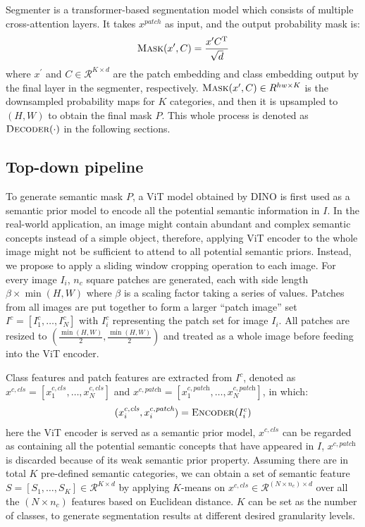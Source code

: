 \documentclass[runningheads]{llncs}
\begin{document}
Segmenter is a transformer-based segmentation model which consists of multiple cross-attention layers. It takes  $x^{patch}$  as input, and the output probability mask is: 
\begin{align}
    \Call{Mask}{x^\prime, C} = \frac{x^\prime C^\mathrm{T}}{\sqrt{d}}
    \label{eq:segmenter}
\end{align}
where $x^\prime$ and $C \in \mathcal{R}^{K \times d}$ are the patch embedding and class embedding output by the final layer in the segmenter, respectively. $\Call{Mask}{x^\prime, C} \in R^{hw \times K}$ is the downsampled probability maps for $K$ categories, and then it is upsampled to $(H, W)$ to obtain the final mask $P$. This whole process is denoted as $\Call{Decoder}{\cdot}$ in the following sections.

\subsection{Top-down pipeline}

To generate semantic mask $P$, a ViT model obtained by DINO is first used as a semantic prior model to encode all the potential semantic information in $I$. In the real-world application, an image might contain abundant and complex semantic concepts instead of a simple object, therefore, applying ViT encoder to the whole image might not be sufficient to attend to all potential semantic priors. Instead, we propose to apply a sliding window cropping operation to each image. For every image $I_i$,  $n_c$ square patches are generated, each with side length $\beta \times\min(H, W)$ where $\beta$ is a scaling factor taking a series of values. 
Patches from all images are put together to form a larger ``patch image'' set $I^c = [I^c_1, \dots, I^c_N]$ with $I^c_i$ representing the patch set for image $I_i$.
All patches are resized to  $(\frac{\min(H, W)}{2}, \frac{\min(H, W)}{2})$ and treated as a whole image before feeding into the ViT encoder.

Class features and patch features are extracted from $I^c$, denoted as $x^{c,\textit{cls}} = [x_1^{c,\textit{cls}}, \dots, x_N^{c,\textit{cls}}]$ and  $x^{c,\textit{patch}} = [x_1^{c,\textit{patch}}, \dots, x_N^{c,\textit{patch}}]$, in which:
\begin{align}
    (x^{c,\textit{cls}}_i, x^{c,\textit{patch}}_{i}) = \Call{Encoder}{I_i^c}
\end{align}
here the ViT encoder is served as a semantic prior model, $x^{c,\textit{cls}}$ can be regarded as containing all the potential semantic concepts that have appeared in $I$, $x^{c,\textit{patch}}$ is discarded because of its weak semantic prior property. Assuming there are in total $K$ pre-defined semantic categories, we can obtain  a set of semantic feature $S = [S_1, \dots, S_K] \in \mathcal{R}^{K \times d}$ by applying $K$-means on $x^{c,\textit{cls}} \in \mathcal{R}^{(N \times n_c) \times d}$ over all the $(N \times n_c)$ features based on Euclidean distance. $K$ can be set as the number of classes, to generate segmentation results at different desired granularity levels.
\end{document}
